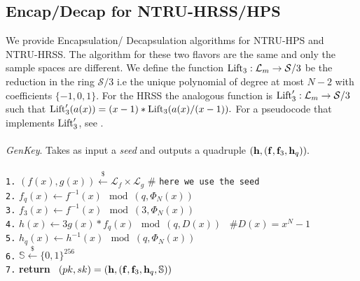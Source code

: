 \documentclass{amsart}
\numberwithin{equation}{section}
\begin{document}
 \subsection{Encap/Decap for NTRU-HRSS/HPS}
 We provide Encapsulation/ Decapsulation algorithms for NTRU-HPS and NTRU-HRSS. The algorithm for these two flavors are the same and only the sample spaces are different. We define the function ${\rm{Lift}_3}:{\mathcal{L}}_m\rightarrow {\mathcal{S}}/3$ be the reduction in the ring ${\mathcal{S}}/3$ i.e the unique polynomial of degree at most $N-2$ with coefficients $\{-1,0,1\}.$ For the HRSS the analogous function is ${\rm{Lift}'_3}:{\mathcal{L}}_m\rightarrow {\mathcal{S}}/3$ such that ${\rm{Lift}'_3}(a(x))=(x-1)*{\rm{Lift}_3}(a(x)/(x-1)).$ For a pseudocode that implements ${\rm{Lift}'_3}$, see \cite[Appendix 2 - Algorithm 8]{HRSS-2}.\\\\
 {\it GenKey}. Takes as input a {\it{seed}} and outputs a quadruple $({\bf h},({\bf f},{\bf f}_3,{\bf h}_q)).$\\\\
\texttt{1.}   $(f(x),g(x))\xleftarrow{\$} {\mathcal{L}}_f\times {\mathcal{L}}_g$ \hspace{10pt} \# {\texttt{here\ we\ use  the seed}}\\
\texttt{2.}  $f_q(x)\leftarrow f^{-1}(x)\mod{(q,\Phi_N(x))}$\\
\texttt{3.}   $f_3(x)\leftarrow f^{-1}(x)\mod{(3,\Phi_N(x))}$\\
\texttt{4.}   $h(x) \leftarrow 3g(x)*f_q(x)\mod{(q,D(x))}$ \ $\# D(x)=x^N-1$\\
\texttt{5.}  $ h_q(x) \leftarrow h^{-1}(x)\mod{(q,\Phi_N(x))}$\ \\  
\texttt{6.}  $ {\mathbb{S}} \xleftarrow{\$} \{0,1\}^{256}$\ \\ 
\texttt{7.}   {\bf return} \ $(pk,sk)=({\bf h},({\bf f},{\bf f}_3,{\bf h}_q,{\mathbb{S}}))
 $\\
\end{document}
